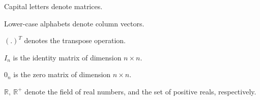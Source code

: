 \thispagestyle{empty}
\begin{notation}

Capital letters denote matrices.\vspace{6 pt}

\noindent Lower-case alphabets denote column vectors.\vspace{6 pt}

\noindent $(.)^{T}$ denotes the transpose operation.\vspace{6 pt}

\noindent $I_n$ is the identity matrix of dimension $n\times n$.\vspace{6 pt}

\noindent $0_n$ is the zero matrix of dimension $n\times n$.\vspace{6 pt}

\noindent $\mathbb R,\ \mathbb R^+$ denote the field of real numbers, and the set of positive reals, respectively.\vspace{6 pt}



\end{notation}


